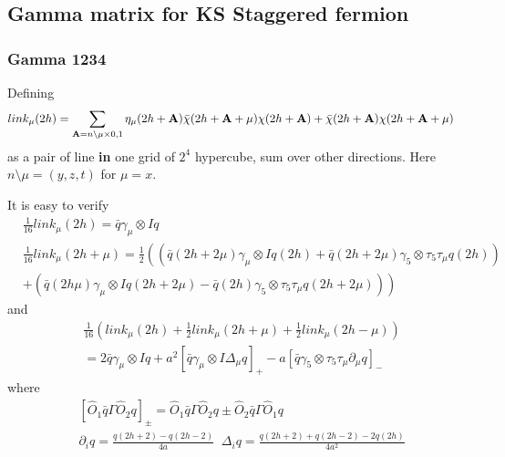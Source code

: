 \subsection{\label{sec:GammaMatrixKS}Gamma matrix for KS Staggered fermion}

\subsubsection{\label{sec:gamma1234ks}Gamma 1234}

Defining
\begin{equation}
\begin{split}
&link_{\mu}(2h)=\sum _{{\bf A}=n\setminus \mu \times 0,1} \eta _{\mu}(2h+{\bf A})\bar{\chi}(2h+{\bf A}+\mu)\chi(2h+{\bf A})+\bar{\chi}(2h+{\bf A})\chi (2h +{\bf A}+ \mu)
\end{split}
\end{equation}
as a pair of line \textbf{in} one grid of $2^4$ hypercube, sum over other directions.
Here $n\setminus \mu = (y,z,t)$ for $\mu=x$.

It is easy to verify
\begin{equation}
\begin{split}
&\frac{1}{16}link_{\mu}(2h)= \bar{q}\gamma _{\mu}\otimes I q\\
&\frac{1}{16}link_{\mu}(2h+\mu)=\frac{1}{2}\left((\bar{q}(2h+2\mu)\gamma _{\mu}\otimes I q(2h)+\bar{q}(2h+2\mu)\gamma _5\otimes \tau_5\tau_{\mu} q(2h))\right.\\
&\left.+(\bar{q}(2h\mu)\gamma _{\mu}\otimes I q(2h+2\mu)-\bar{q}(2h)\gamma _5\otimes \tau_5\tau_{\mu} q(2h+2\mu))\right)
\end{split}
\end{equation}
and
\begin{equation}
\begin{split}
&\frac{1}{16}\left(link_{\mu}(2h)+\frac{1}{2}link_{\mu}(2h+\mu)+\frac{1}{2}link_{\mu}(2h-\mu)\right)\\
&=2\bar{q}\gamma _{\mu}\otimes I q +a^2 \left[ \bar{q}\gamma _{\mu}\otimes I \Delta _{\mu} q\right]_+ - a \left[\bar{q}\gamma _5\otimes \tau_5\tau_{\mu} \partial _{\mu} q\right]_-
\end{split}
\end{equation}
where
\textcolor[rgb]{0,0,1}{
\begin{equation}
\begin{split}
&\left[ \hat{O}_1\bar{q}\Gamma \hat{O}_2 q \right]_{\pm} = \hat{O}_1\bar{q}\Gamma \hat{O}_2q \pm \hat{O}_2\bar{q}\Gamma \hat{O}_1 q \\
&\partial _i q=\frac{q(2h+2)-q(2h-2)}{4a}\;\;\Delta _i q=\frac{q(2h+2)+q(2h-2)-2q(2h)}{4a^2}
\end{split}
\end{equation} 
}

